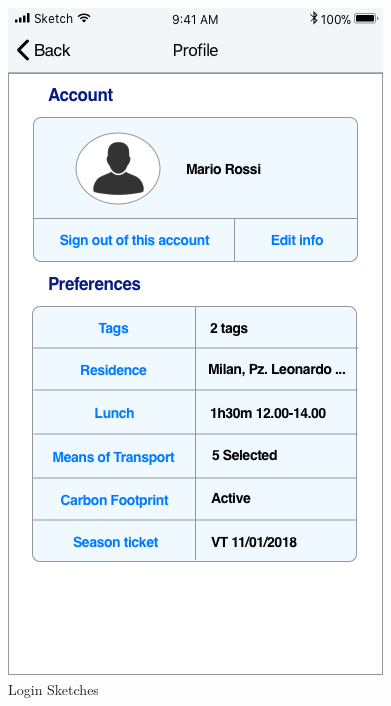 \begin{figure}[H]
	\hspace{0.5cm}
	\includegraphics[scale=0.23]{Images/Interface/Login/4_profile_no_trips}
	\caption{Login Sketches}
\end{figure}

